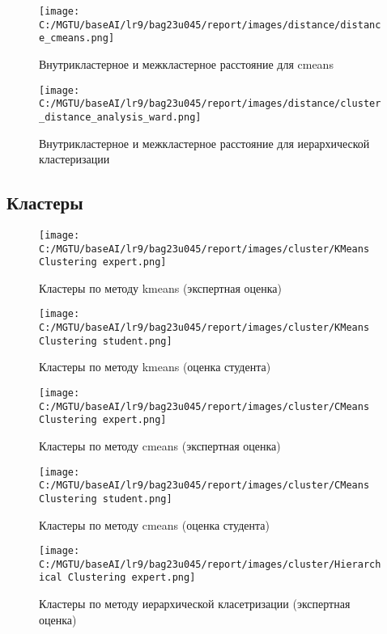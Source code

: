 \begin{figure}[H]
    \centering
    \texttt{[image: C:/MGTU/baseAI/lr9/bag23u045/report/images/distance/distance\_cmeans.png]}
    \caption{Внутрикластерное и межкластерное расстояние для cmeans}
\end{figure}

\begin{figure}[H]
    \centering
    \texttt{[image: C:/MGTU/baseAI/lr9/bag23u045/report/images/distance/cluster\_distance\_analysis\_ward.png]}
    \caption{Внутрикластерное и межкластерное расстояние для иерархической кластеризации}
\end{figure}

\subsection{Кластеры} \label{clusters}

\begin{figure}[H]
    \centering
    \texttt{[image: C:/MGTU/baseAI/lr9/bag23u045/report/images/cluster/KMeans Clustering expert.png]}
    \caption{Кластеры по методу kmeans (экспертная оценка)}
\end{figure}

\begin{figure}[H]
    \centering
    \texttt{[image: C:/MGTU/baseAI/lr9/bag23u045/report/images/cluster/KMeans Clustering student.png]}
    \caption{Кластеры по методу kmeans (оценка студента)}
\end{figure}

\begin{figure}[H]
    \centering
    \texttt{[image: C:/MGTU/baseAI/lr9/bag23u045/report/images/cluster/CMeans Clustering expert.png]}
    \caption{Кластеры по методу cmeans (экспертная оценка)}
\end{figure}

\begin{figure}[H]
    \centering
    \texttt{[image: C:/MGTU/baseAI/lr9/bag23u045/report/images/cluster/CMeans Clustering student.png]}
    \caption{Кластеры по методу cmeans (оценка студента)}
\end{figure}

\begin{figure}[H]
    \centering
    \texttt{[image: C:/MGTU/baseAI/lr9/bag23u045/report/images/cluster/Hierarchical Clustering expert.png]}
    \caption{Кластеры по методу иерархической класетризации (экспертная оценка)}
\end{figure}

